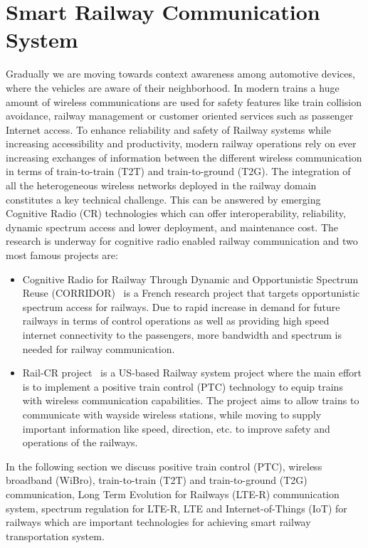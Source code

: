 \chapter{Smart Railway Communication System}

Gradually we are moving towards context awareness among automotive devices, where the vehicles are aware of their neighborhood. In modern trains a huge amount of wireless communications are used for safety features like train collision avoidance, railway management or customer oriented services such as passenger Internet access. To enhance reliability and safety of Railway systems while increasing accessibility and productivity, modern railway operations rely on ever increasing exchanges of information between the different wireless communication in terms of train-to-train (T2T) and train-to-ground (T2G). The integration of all the heterogeneous wireless networks deployed in the railway domain constitutes a key technical challenge. This can be answered by emerging Cognitive Radio (CR) technologies which can offer interoperability, reliability, dynamic spectrum access and lower deployment, and maintenance cost. The research is underway for cognitive radio enabled railway communication and two most famous projects are:

\begin{itemize}

\item Cognitive Radio for Railway Through Dynamic and Opportunistic Spectrum Reuse (CORRIDOR)~\cite{corridor} is a French research project that targets opportunistic spectrum access for railways. Due to rapid increase in demand for future railways in terms of control operations as well as providing high speed internet connectivity to the passengers, more bandwidth and spectrum is needed for railway communication.

\item Rail-CR project~\cite{5621621} is a US-based Railway system project where the main effort is to implement a positive train control (PTC) technology to equip trains with wireless communication capabilities. The project aims to allow trains to communicate with wayside wireless stations, while moving to supply important information like speed, direction, etc. to improve safety and operations of the railways.

\end{itemize}

In the following section we discuss positive train control (PTC), wireless broadband (WiBro), train-to-train (T2T) and train-to-ground (T2G) communication, Long Term Evolution for Railways (LTE-R) communication system, spectrum regulation for LTE-R, LTE and Internet-of-Things (IoT) for railways which are important technologies for achieving smart railway transportation system.

